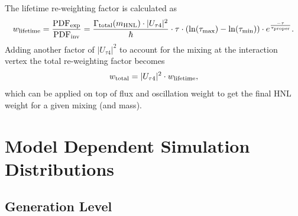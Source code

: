 The lifetime re-weighting factor is calculated as
\begin{equation}
    w_\mathrm{lifetime} = \frac{\mathrm{PDF}_\mathrm{exp}}{\mathrm{PDF}_\mathrm{inv}} = \frac{\Gamma_\mathrm{total}(m_\mathrm{HNL}) \cdot |U_{\tau4}|^2}{\hbar} \cdot \tau \cdot (\ln(\tau_\mathrm{max}) - \ln(\tau_\mathrm{min})) \cdot e^{\frac{-\tau}{\tau_\mathrm{proper}}}.
    \labeq{weight_lifetime}
\end{equation}
Adding another factor of $|U_{\tau4}|^2$ to account for the mixing at the interaction vertex the total re-weighting factor becomes
\begin{equation}
    w_\mathrm{total} = |U_{\tau4}|^2 \cdot w_\mathrm{lifetime},
    \labeq{weight_full}
\end{equation}
which can be applied on top of flux and oscillation weight to get the final HNL weight for a given mixing (and mass).

\section{Model Dependent Simulation Distributions}

\subsection{Generation Level}

